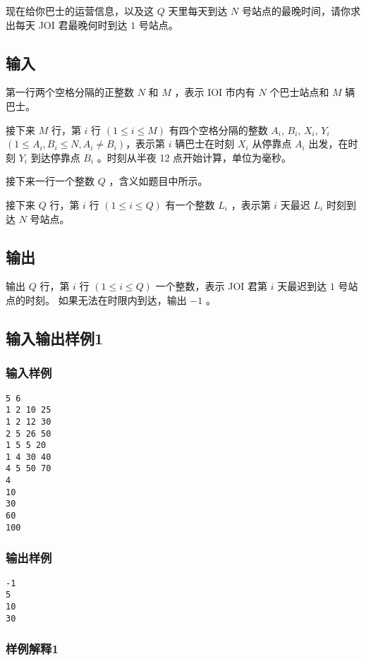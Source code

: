 \documentclass[UTF8]{ctexart}
\begin{document}
现在给你巴士的运营信息，以及这 $Q$ 天里每天到达 $N$ 号站点的最晚时间，请你求出每天 JOI 君最晚何时到达 $1$ 号站点。

\subsection{输入}

第一行两个空格分隔的正整数 $N$ 和 $M$ ，表示 IOI 市内有 $N$ 个巴士站点和 $M$ 辆巴士。

接下来 $M$ 行，第 $i$ 行 $(1\le i\le M)$ 有四个空格分隔的整数 $A_i$, $B_i$, $X_i$, $Y_i$ $(1\le A_i,B_i\le N, A_i\neq B_i)$，表示第 $i$ 辆巴士在时刻 $X_i$ 从停靠点 $A_i$ 出发，在时刻 $Y_i$ 到达停靠点 $B_i$ 。时刻从半夜 12 点开始计算，单位为毫秒。

接下来一行一个整数 $Q$ ，含义如题目中所示。

接下来 $Q$ 行，第 $i$ 行 $(1\le i\le Q)$ 有一个整数 $L_i$ ，表示第 $i$ 天最迟 $L_i$ 时刻到达 $N$ 号站点。

\subsection{输出}

输出 $Q$ 行，第 $i$ 行 $(1\le i\le Q)$ 一个整数，表示 JOI 君第 $i$ 天最迟到达 $1$ 号站点的时刻。 如果无法在时限内到达，输出 $-1$ 。

\subsection{输入输出样例1}


\subsubsection{输入样例}

\begin{lstlisting}
5 6
1 2 10 25
1 2 12 30
2 5 26 50
1 5 5 20
1 4 30 40
4 5 50 70
4
10
30
60
100
\end{lstlisting}


\subsubsection{输出样例}

\begin{lstlisting}
-1
5
10
30
\end{lstlisting}


\subsubsection{样例解释1}
\end{document}
